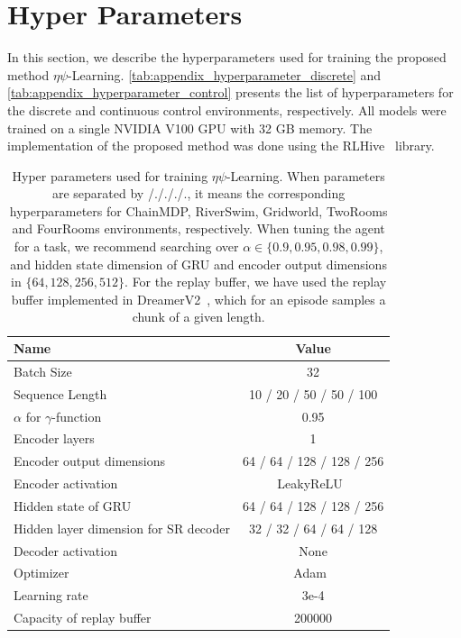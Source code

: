 \documentclass{article}
\theoremstyle{plain}
\theoremstyle{definition}
\theoremstyle{remark}
\newcommand{\alg}{$\eta$$\psi$-Learning}
\begin{document}
\section{Hyper Parameters}
\label{app:hyperparameter}

In this section, we describe the hyperparameters used for training the proposed method \alg{}. \autoref{tab:appendix_hyperparameter_discrete} and \autoref{tab:appendix_hyperparameter_control} presents the list of hyperparameters for the discrete and continuous control environments, respectively.
All models were trained on a single NVIDIA V100 GPU with 32 GB memory.
The implementation of the proposed method was done using the RLHive~\citep{Patil2023} library.

\begin{table}[hbt!]
	\centering
		\begin{tabular}{l|c}
			\toprule
			\textbf{Name} & \textbf{Value}\\
			\midrule
             Batch Size & 32 \\
             Sequence Length & 10 / 20 / 50 / 50 / 100 \\
             $\alpha$ for $\gamma$-function & 0.95 \\
             Encoder layers & 1\\
             Encoder output dimensions & 64 / 64 / 128 / 128 / 256\\ 
             Encoder activation & LeakyReLU~\cite{yu2017unsupervised} \\
             Hidden state of GRU & 64 / 64 / 128 / 128 / 256\\
             Hidden layer dimension for SR decoder & 32 / 32 / 64 / 64 / 128\\
             Decoder activation & None\\
             Optimizer & Adam~\cite{kingma2014adam} \\
             Learning rate & 3e-4\\
             Capacity of replay buffer & 200000 \\
            \bottomrule
    	\end{tabular}
	\caption{Hyper parameters used for training \alg{}. When parameters are separated by /./././., it means the corresponding hyperparameters for ChainMDP, RiverSwim, Gridworld, TwoRooms and FourRooms environments, respectively. When tuning the agent for a task, we recommend searching over $\alpha \in \{0.9, 0.95, 0.98, 0.99\}$, and hidden state dimension of GRU and encoder output dimensions in $\{64, 128, 256, 512\}$. For the replay buffer, we have used the replay buffer implemented in DreamerV2~\cite{hafner2020dreamerv2}, which for an episode samples a chunk of a given length.}
	\label{tab:appendix_hyperparameter_discrete}
\end{table}
\end{document}
